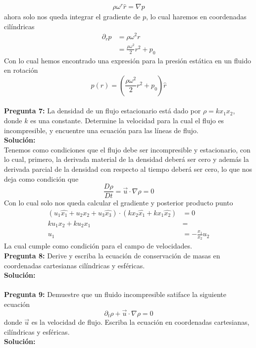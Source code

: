 \documentclass[11pt,letterpaper]{article}
\begin{document}
\begin{align*}
  \rho\omega^r\hat{r}=\nabla p
\end{align*}
ahora solo nos queda integrar el gradiente de $p$, lo cual haremos en coordenadas cilíndricas
\begin{align*}
  \partial_r p &  = \rho\omega^2r \\
  & = \frac{\rho \omega^2}{2}r^2 + p_0
\end{align*}
Con lo cual hemos encontrado una expresión para la presión estática en un fluido en rotación
\begin{equation}
  p(r) = \left(\frac{\rho \omega^2}{2}r^2 + p_0\right)\hat{r}
\end{equation}
\\
\textbf{Pregunta 7:} La densidad de un flujo estacionario está dado por $\rho = kx_1x_2$, donde $k$ es una constante. Determine la velocidad para la cual el flujo es incompresible, y encuentre una ecuación para las líneas de flujo. \\
\textbf{Solución:} \\
Tenemos como condiciones que el flujo debe ser incompresible y estacionario, con lo cual, primero, la derivada material de la densidad deberá ser cero y además la derivada parcial de la densidad con respecto al tiempo deberá ser cero, lo que nos deja como condición  que
\begin{equation}
  \frac{D\rho}{Dt} = \vec{u}\cdot\nabla\rho = 0
\end{equation}
Con lo cual solo nos queda calcular el gradiente y posterior producto punto
\begin{align*}
  (u_1\hat{x_1}+u_2\hat{x_2}+u_3\hat{x_3})\cdot \left(kx_2\hat{x_1}+kx_1\hat{x_2}\right) & = 0 \\
  ku_1x_2 + ku_2x_1 & =  \\
  u_1 & = -\frac{x_1}{x_2}u_2
\end{align*}
La cual cumple como condición para el campo de velocidades. 
\\

\textbf{Pregunta 8:} Derive y escriba la ecuación de conservación de masas en coordenadas cartesianas cilíndricas y esféricas. \\
\textbf{Solución:} \\
\\

\textbf{Pregunta 9:} Demuestre que un fluido incompresible satiface la siguiente ecuación
\begin{equation}
  \partial_t \rho + \vec{u} \cdot \nabla \rho = 0
\end{equation}
donde $\vec{u}$ es la velocidad de flujo. Escriba la ecuación en coordenadas cartesianas, cilíndricas y esféricas.  \\
\textbf{Solución:}
\\
\end{document}

